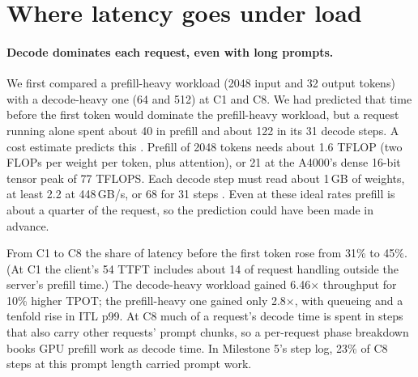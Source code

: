 \section{Where latency goes under load}
\label{sec:load}

\paragraph{Decode dominates each request, even with long prompts.}
We first compared a prefill-heavy workload (2048 input and 32 output tokens) with a
decode-heavy one (64 and 512) at C1 and C8. We had predicted that time before the first
token would dominate the prefill-heavy workload, but a request running alone spent
about 40\ms{} in prefill and about 122\ms{} in its 31 decode steps. A cost estimate
predicts this \citep{pope2023scaling}. Prefill of 2048 tokens needs about 1.6 TFLOP
(two FLOPs per weight per token, plus attention), or 21\ms{} at the A4000's dense
16-bit tensor peak of 77 TFLOPS. Each decode step must read about 1\,GB of weights, at least 2.2\ms{} at 448\,GB/s, or 68\ms{} for 31 steps
\citep{nvidiaa4000}. Even at these ideal rates prefill is about a quarter of the
request, so the prediction could have been made in advance.

From C1 to C8 the share of latency before the first token rose from 31\% to 45\%. (At
C1 the client's 54\ms{} TTFT includes about 14\ms{} of request handling outside the
server's prefill time.) The decode-heavy workload gained 6.46$\times$ throughput for
10\% higher TPOT; the prefill-heavy one gained only 2.8$\times$, with
queueing and a tenfold rise in ITL p99. At C8 much of a request's decode time is spent
in steps that also carry other requests' prompt chunks, so a per-request phase
breakdown books GPU prefill work as decode time. In Milestone 5's step log, 23\% of C8
steps at this prompt length carried prompt work.

